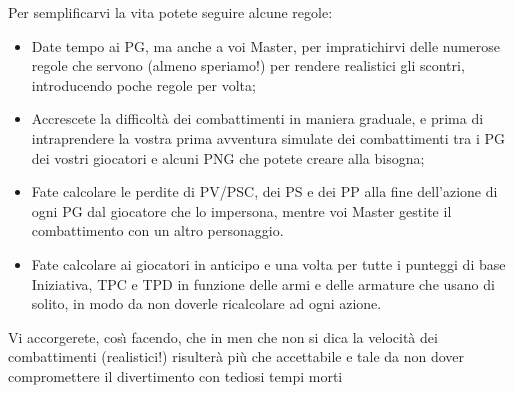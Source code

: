 \begin{faq}
{    Per semplificarvi la vita potete seguire alcune regole:

\begin{itemize}    
    \item Date tempo ai PG, ma anche a voi Master, per impratichirvi delle
    numerose regole che servono (almeno speriamo!) per rendere
    realistici gli scontri, introducendo poche regole per volta;
  
    \item Accrescete la difficolt\`a dei combattimenti in maniera
    graduale, e prima di intraprendere la vostra prima avventura
    simulate dei combattimenti tra i PG dei vostri giocatori e alcuni
    PNG che potete creare alla bisogna;
    
  \item Fate calcolare le perdite di PV/PSC, dei PS e dei PP alla fine
    dell'azione di ogni PG dal giocatore che lo impersona, mentre voi
    Master gestite il combattimento con un altro personaggio.
  
    \item Fate calcolare ai giocatori in anticipo e una volta per tutte i
    punteggi di base Iniziativa, TPC e TPD in funzione delle armi e
    delle armature che usano di solito, in modo da non doverle
    ricalcolare ad ogni azione.
\end{itemize}
    
    Vi accorgerete, cos\`{\i} facendo, che in men che non si dica la
    velocit\`a dei combattimenti (realistici!)  risulter\`a
    pi\`u che accettabile e tale da non dover compromettere il
    divertimento con tediosi tempi morti}
  
  
\end{faq}
